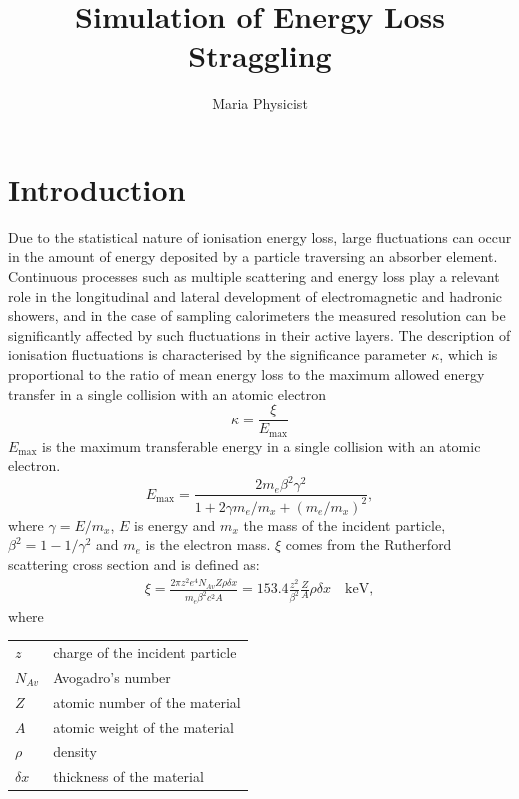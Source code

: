 \documentclass{article}
\title{Simulation of  Energy Loss  Straggling}
\author{Maria Physicist}
\let\SetRowColor\relax
\newcommand{\Emax}{\ensuremath{E_{\mathrm{max}}}}
\begin{document}
\maketitle

\section{Introduction}

Due to the statistical nature of ionisation energy loss, large
fluctuations can occur in the amount of energy deposited by a particle
traversing an absorber element.  Continuous processes such as multiple
scattering and energy loss play a relevant role in the longitudinal
and lateral development of electromagnetic and hadronic
showers, and in the case of sampling calorimeters the
measured resolution can be significantly affected by such fluctuations
in their active layers.  The description of ionisation fluctuations is
characterised by the significance parameter $\kappa$, which is
proportional to the ratio of mean energy loss to the maximum allowed
energy transfer in a single collision with an atomic electron
\[
\kappa =\frac{\xi}{\Emax}
\]
\Emax{}
is the maximum transferable energy in a single collision with
an atomic electron.
\[
\Emax =\frac{2 m_e \beta^2\gamma^2 }
{1 +  2\gamma m_e/m_x + \left ( m_e/m_x\right)^2},
\]
where $\gamma = E/m_x$, $E$ is energy and
$m_x$ the mass of the incident particle, 
$\beta^2 = 1 - 1/\gamma^2$ and $m_e$ is the electron mass. 
$\xi$ comes from the Rutherford scattering cross  section
and is defined as:
\begin{eqnarray*} \xi  = \frac{2\pi z^2 e^4 N_{Av} Z \rho \delta x}
        {m_e \beta^2 c^2 A} =  153.4 \frac{z^2} {\beta^2} \frac{Z}{A}
  \rho \delta x \quad\mathrm{keV},
\end{eqnarray*}
where

\begin{tabular}{ll}
\SetRowColor $z$          & charge of the incident particle \\
\SetRowColor $N_{Av}$     & Avogadro's number \\
\SetRowColor $Z$          & atomic number of the material \\
\SetRowColor $A$          & atomic weight of the material \\
\SetRowColor $\rho$       & density \\
\SetRowColor $ \delta x$  & thickness of the material \\
\end{tabular}
\end{document}
